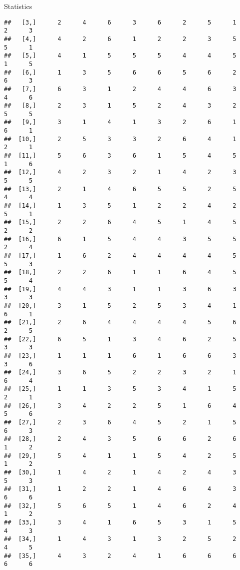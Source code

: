 \documentclass[
  ignorenonframetext,
]{beamer}
\begin{document}
\begin{frame}[fragile]{Statistics}
\begin{verbatim}
##   [3,]      2      4      6      3      6      2      5      1      2      3
##   [4,]      4      2      6      1      2      2      3      5      5      1
##   [5,]      4      1      5      5      5      4      4      5      1      5
##   [6,]      1      3      5      6      6      5      6      2      6      3
##   [7,]      6      3      1      2      4      4      6      3      4      6
##   [8,]      2      3      1      5      2      4      3      2      5      5
##   [9,]      3      1      4      1      3      2      6      1      6      1
##  [10,]      2      5      3      3      2      6      4      1      2      1
##  [11,]      5      6      3      6      1      5      4      5      1      6
##  [12,]      4      2      3      2      1      4      2      3      5      5
##  [13,]      2      1      4      6      5      5      2      5      4      4
##  [14,]      1      3      5      1      2      2      4      2      5      1
##  [15,]      2      2      6      4      5      1      4      5      2      2
##  [16,]      6      1      5      4      4      3      5      5      2      4
##  [17,]      1      6      2      4      4      4      4      5      5      3
##  [18,]      2      2      6      1      1      6      4      5      5      4
##  [19,]      4      4      3      1      1      3      6      3      3      3
##  [20,]      3      1      5      2      5      3      4      1      6      1
##  [21,]      2      6      4      4      4      4      5      6      2      5
##  [22,]      6      5      1      3      4      6      2      5      3      3
##  [23,]      1      1      1      6      1      6      6      3      3      6
##  [24,]      3      6      5      2      2      3      2      1      6      4
##  [25,]      1      1      3      5      3      4      1      5      2      1
##  [26,]      3      4      2      2      5      1      6      4      5      6
##  [27,]      2      3      6      4      5      2      1      5      6      3
##  [28,]      2      4      3      5      6      6      2      6      1      2
##  [29,]      5      4      1      1      5      4      2      5      1      2
##  [30,]      1      4      2      1      4      2      4      3      5      3
##  [31,]      1      2      2      1      4      6      4      3      6      6
##  [32,]      5      6      5      1      4      6      2      4      1      2
##  [33,]      3      4      1      6      5      3      1      5      4      3
##  [34,]      1      4      3      1      3      2      5      2      4      5
##  [35,]      4      3      2      4      1      6      6      6      6      6

\end{verbatim}
\end{frame}
\end{document}
